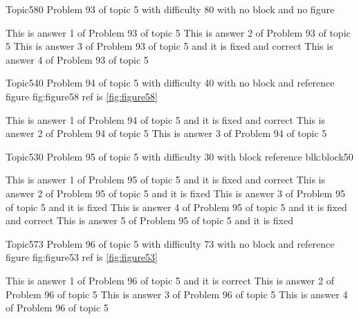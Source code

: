 \documentclass[master]{exam}
\begin{document}
\begin{problem}{Topic5}{80}
	Problem 93 of topic 5 with difficulty 80 with no block and no figure
	\begin{answers}
		\answer This is answer 1 of Problem 93 of topic 5 
		\answer This is answer 2 of Problem 93 of topic 5 
		 This is answer 3 of Problem 93 of topic 5 and it is fixed and correct
		\answer This is answer 4 of Problem 93 of topic 5 
	\end{answers}
\end{problem}

\begin{problem}{Topic5}{40}
	Problem 94 of topic 5 with difficulty 40 with no block and reference figure fig:figure58 ref is \ref{fig:figure58}
	\begin{answers}
		 This is answer 1 of Problem 94 of topic 5 and it is fixed and correct
		\answer This is answer 2 of Problem 94 of topic 5 
		\answer This is answer 3 of Problem 94 of topic 5 
	\end{answers}
\end{problem}

\begin{problem}[requires=blk:block50]{Topic5}{30}
	Problem 95 of topic 5 with difficulty 30 with block reference blk:block50
	\begin{answers}
		 This is answer 1 of Problem 95 of topic 5 and it is fixed and correct
		\answer[fixed] This is answer 2 of Problem 95 of topic 5 and it is fixed
		\answer[fixed] This is answer 3 of Problem 95 of topic 5 and it is fixed
		 This is answer 4 of Problem 95 of topic 5 and it is fixed and correct
		\answer[fixed] This is answer 5 of Problem 95 of topic 5 and it is fixed
	\end{answers}
\end{problem}

\begin{problem}{Topic5}{73}
	Problem 96 of topic 5 with difficulty 73 with no block and reference figure fig:figure53 ref is \ref{fig:figure53}
	\begin{answers}
		\answer[correct] This is answer 1 of Problem 96 of topic 5 and it is correct
		\answer This is answer 2 of Problem 96 of topic 5 
		\answer This is answer 3 of Problem 96 of topic 5 
		\answer This is answer 4 of Problem 96 of topic 5 
	\end{answers}
\end{problem}
\end{document}
